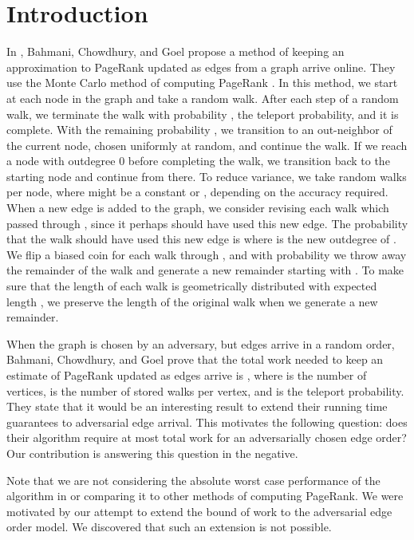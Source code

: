 \documentclass{article}
\begin{document}
\section{Introduction}
In \cite{incremental_pagerank}, Bahmani, Chowdhury, and Goel propose a method of keeping an approximation to PageRank updated as edges from a graph arrive online.  They use the Monte Carlo method of computing PageRank \cite{monte_carlo_pagerank}.  In this method, we start at each node in the graph and take a random walk.  After each step of a random walk, we terminate the walk with probability , the teleport probability, and it is complete.  With the remaining probability , we transition to an out-neighbor of the current node, chosen uniformly at random, and continue the walk.  If we reach a node  with outdegree 0 before completing the walk, we transition back to the starting node and continue from there.  To reduce variance, we take  random walks per node, where  might be a constant or , depending on the accuracy required.  When a new edge  is added to the graph, we consider revising each walk which passed through , since it perhaps should have used this new edge.  The probability that the walk should have used this new edge is  where  is the new outdegree of .  We flip a biased coin for each walk through , and with probability   we throw away the remainder of the walk and generate a new remainder starting with .  To make sure that the length of each walk is geometrically distributed with expected length , we preserve the length of the original walk when we generate a new remainder. 

When the graph is chosen by an adversary, but edges arrive in a random order, Bahmani, Chowdhury, and Goel \cite{incremental_pagerank} prove that the total work needed to keep an estimate of PageRank updated as  edges arrive is , where  is the number of vertices,  is the number of stored walks per vertex, and  is the teleport probability.   They state that it would be an interesting result to extend their running time guarantees to adversarial edge arrival.  This motivates the following question: does their algorithm require at most  total work for an adversarially chosen edge order? Our contribution is answering this question in the negative.

Note that we are not considering the absolute worst case performance of the algorithm in \cite{incremental_pagerank} or comparing it to other methods of computing PageRank.  We were motivated by our attempt to extend the bound of  work to the adversarial edge order model.  We discovered that such an extension is not possible.
\end{document}
